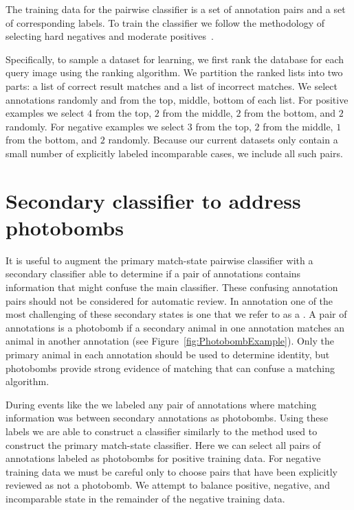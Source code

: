 The training data for the pairwise classifier is a set of annotation pairs and
  a set of corresponding labels.
To train the classifier we follow the methodology of selecting hard negatives
  and moderate positives~\cite{shi_embedding_2016}.

Specifically, to sample a dataset for learning, we first rank the database for
  each query image using the ranking algorithm.
We partition the ranked lists into two parts:
a list of correct result matches and a list of incorrect matches.
We select annotations randomly and from the top, middle, bottom of each list.
For positive examples we select $4$ from the top, $2$ from the middle, $2$
  from the bottom, and $2$ randomly.
For negative examples we select $3$ from the top, $2$ from the middle, $1$
  from the bottom, and $2$ randomly.
Because our current datasets only contain a small number of explicitly labeled
  incomparable cases, we include all such pairs.

\section{Secondary classifier to address photobombs}
    It is useful to augment the primary match-state pairwise classifier with a
      secondary classifier able to determine if a pair of annotations contains
      information that might confuse the main classifier.
    These confusing annotation pairs should not be considered for automatic
      review.
    In annotation one of the most challenging of these secondary states is one
      that we refer to as a .
    A pair of annotations is a photobomb if a secondary animal in one
      annotation matches an animal in another annotation (\eg see
      Figure~\ref{fig:PhotobombExample}).
    Only the primary animal in each annotation should be used to determine
      identity, but photobombs provide strong evidence of matching that can
      confuse a matching algorithm.

    \PhotobombExample{}

    During events like the \GZC{} we labeled any pair of annotations where
      matching information was between secondary annotations as photobombs.
    Using these labels we are able to construct a classifier similarly to the
      method used to construct the primary match-state classifier.
    Here we can select all pairs of annotations labeled as photobombs for
      positive training data.
    For negative training data we must be careful only to choose pairs that
      have been explicitly reviewed as not a photobomb.
    We attempt to balance positive, negative, and incomparable state in the
      remainder of the negative training data.

